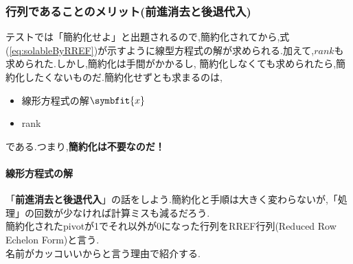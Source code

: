 \subsubsection{行列であることのメリット(前進消去と後退代入)}\label{sub:Gaussian}
テストでは「簡約化せよ」と出題されるので,簡約化されてから,式(\ref{eq:solableByRREF})が示すように線型方程式の解が求められる.加えて,$rank$も求められた.しかし,簡約化は手間がかかるし,
簡約化しなくても求められたら,簡約化したくないものだ.簡約化せずとも求まるのは,
\begin{itemize}
    \item 線形方程式の解$\symbfit{x}$
    \item rank
\end{itemize}
である.つまり,\textbf{簡約化は不要なのだ！}
\paragraph{線形方程式の解}
「\textbf{前進消去と後退代入}」の話をしよう.簡約化と手順は大きく変わらないが,「処理」の回数が少なければ計算ミスも減るだろう.\\
簡約化されたpivotが1でそれ以外が0になった行列をRREF行列(Reduced Row Echelon Form)と言う.\\名前がカッコいいからと言う理由で紹介する.

